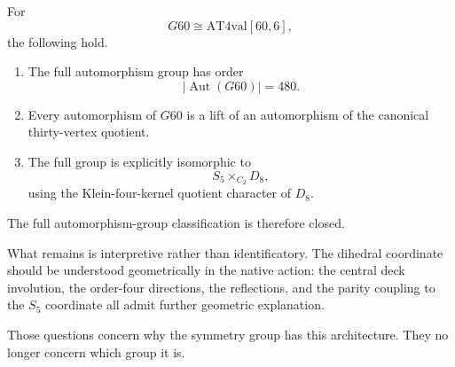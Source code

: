 \begin{theorem}
For
\[
G60\cong \mathrm{AT4val}[60,6],
\]
the following hold.

\begin{enumerate}
\item The full automorphism group has order
\[
\left|\operatorname{Aut}(G60)\right|=480.
\]

\item Every automorphism of $G60$ is a lift of an automorphism of the
canonical thirty-vertex quotient.

\item The full group is explicitly isomorphic to
\[
S_5\times_{C_2}D_8,
\]
using the Klein-four-kernel quotient character of $D_8$.
\end{enumerate}
\end{theorem}

The full automorphism-group classification is therefore closed.

What remains is interpretive rather than identificatory. The dihedral
coordinate should be understood geometrically in the native action: the
central deck involution, the order-four directions, the reflections, and
the parity coupling to the $S_5$ coordinate all admit further geometric
explanation.

Those questions concern why the symmetry group has this architecture.
They no longer concern which group it is.
